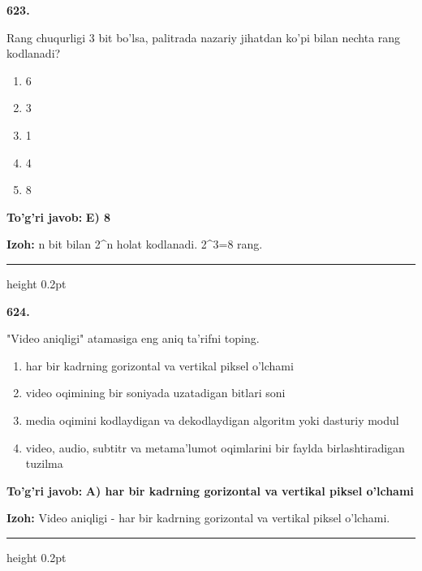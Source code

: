 \documentclass[10pt,a4paper,oneside]{article}
\begin{document}
\noindent\textbf{\color{ink}623.}
\par
Rang chuqurligi 3 bit bo'lsa, palitrada nazariy jihatdan ko'pi bilan nechta rang kodlanadi?
\begin{enumerate}[label=\Alph*),leftmargin=9mm]
\item 6
\item 3
\item 1
\item 4
\item 8
\end{enumerate}
\begin{tcolorbox}[enhanced,breakable,colback=teal!4,colframe=teal!50!black,boxrule=0.5pt,arc=1.1mm,left=3mm,right=3mm,top=1.7mm,bottom=1.7mm,before skip=2mm,after skip=2mm]
\textbf{\color{teal}To'g'ri javob:} \textbf{E) 8}
\par\smallskip
\textbf{Izoh:} n bit bilan 2\textasciicircum{}n holat kodlanadi. 2\textasciicircum{}3=8 rang.
\end{tcolorbox}
\vspace{2mm}\hrule height 0.2pt \vspace{3mm}

\noindent\textbf{\color{ink}624.}
\par
"Video aniqligi" atamasiga eng aniq ta'rifni toping.
\begin{enumerate}[label=\Alph*),leftmargin=9mm]
\item har bir kadrning gorizontal va vertikal piksel o'lchami
\item video oqimining bir soniyada uzatadigan bitlari soni
\item media oqimini kodlaydigan va dekodlaydigan algoritm yoki dasturiy modul
\item video, audio, subtitr va metama'lumot oqimlarini bir faylda birlashtiradigan tuzilma
\end{enumerate}
\begin{tcolorbox}[enhanced,breakable,colback=teal!4,colframe=teal!50!black,boxrule=0.5pt,arc=1.1mm,left=3mm,right=3mm,top=1.7mm,bottom=1.7mm,before skip=2mm,after skip=2mm]
\textbf{\color{teal}To'g'ri javob:} \textbf{A) har bir kadrning gorizontal va vertikal piksel o'lchami}
\par\smallskip
\textbf{Izoh:} Video aniqligi - har bir kadrning gorizontal va vertikal piksel o'lchami.
\end{tcolorbox}
\vspace{2mm}\hrule height 0.2pt \vspace{3mm}
\end{document}
